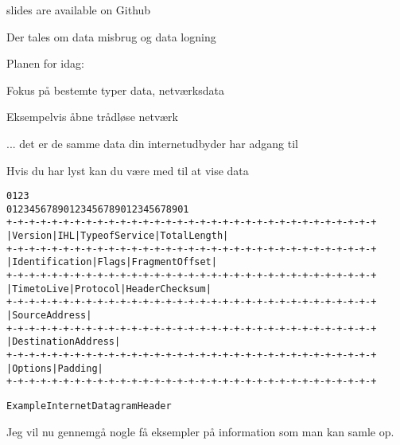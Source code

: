 \documentclass[18pt,landscape,a4paper,footrule]{foils}
\begin{document}


\vskip 1cm
\centerline{\footnotesize slides are available on Github}


Der tales om data misbrug og data logning

Planen for idag:
\begin{list2}
\item Fokus på bestemte typer data, netværksdata
\item Eksempelvis åbne trådløse netværk
\item ... det er de samme data din internetudbyder har adgang til
\end{list2}

\vskip 2cm
\centerline{Hvis du har lyst kan du være med til at vise data}




\begin{alltt}
\small
    0                   1                   2                   3
    0 1 2 3 4 5 6 7 8 9 0 1 2 3 4 5 6 7 8 9 0 1 2 3 4 5 6 7 8 9 0 1
   +-+-+-+-+-+-+-+-+-+-+-+-+-+-+-+-+-+-+-+-+-+-+-+-+-+-+-+-+-+-+-+-+
   |Version|  IHL  |Type of Service|          Total Length         |
   +-+-+-+-+-+-+-+-+-+-+-+-+-+-+-+-+-+-+-+-+-+-+-+-+-+-+-+-+-+-+-+-+
   |         Identification        |Flags|      Fragment Offset    |
   +-+-+-+-+-+-+-+-+-+-+-+-+-+-+-+-+-+-+-+-+-+-+-+-+-+-+-+-+-+-+-+-+
   |  Time to Live |    Protocol   |         Header Checksum       |
   +-+-+-+-+-+-+-+-+-+-+-+-+-+-+-+-+-+-+-+-+-+-+-+-+-+-+-+-+-+-+-+-+
   |                       Source Address                          |
   +-+-+-+-+-+-+-+-+-+-+-+-+-+-+-+-+-+-+-+-+-+-+-+-+-+-+-+-+-+-+-+-+
   |                    Destination Address                        |
   +-+-+-+-+-+-+-+-+-+-+-+-+-+-+-+-+-+-+-+-+-+-+-+-+-+-+-+-+-+-+-+-+
   |                    Options                    |    Padding    |
   +-+-+-+-+-+-+-+-+-+-+-+-+-+-+-+-+-+-+-+-+-+-+-+-+-+-+-+-+-+-+-+-+

                    Example Internet Datagram Header
\end{alltt}



Jeg vil nu gennemgå nogle få eksempler på information som man kan samle op.
\end{document}
